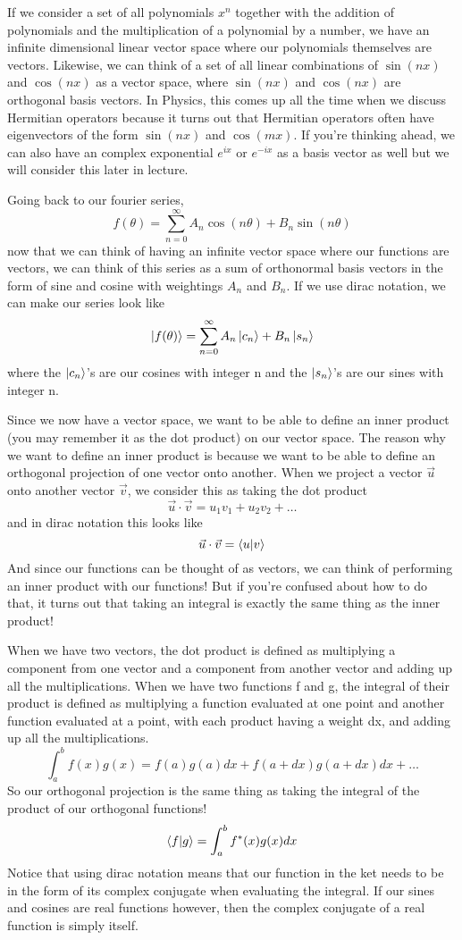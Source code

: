 \documentclass{article}
\newcommand{\be}{\begin{equation}}
\newcommand{\ee}{\end{equation}}
\begin{document}
If we consider a set of all polynomials $x^n$ together with the addition of polynomials and the multiplication of a polynomial by a number, we have an infinite dimensional linear vector space where our polynomials themselves are vectors.
Likewise, we can think of a set of all linear combinations of $\sin(nx)$ and $\cos(nx)$ as a vector space, where $\sin(nx)$ and $\cos(nx)$ are orthogonal basis vectors.
In Physics, this comes up all the time when we discuss Hermitian operators because it turns out that Hermitian operators often have eigenvectors of the form $\sin(nx)$ and $\cos(mx)$.
If you're thinking ahead, we can also have an complex exponential $e^{ix}$ or $e^{-ix}$ as a basis vector as well but we will consider this later in lecture.

Going back to our fourier series,
\be
  f(\theta) = \sum_{n = 0}^{\infty} A_n \cos(n \theta) + B_n \sin(n \theta)
\ee
now that we can think of having an infinite vector space where our functions are vectors, we can think of this series as a sum of orthonormal basis vectors in the form of sine and cosine with weightings $A_n$ and $B_n$.
If we use dirac notation, we can make our series look like
\be
  \ket{f(\theta)} = \sum_{n=0}^{\infty} A_n \ket{c_n} + B_n \ket{s_n}
\ee
where the $\ket{c_n}$'s are our cosines with integer n and the $\ket{s_n}$'s are our sines with integer n.

Since we now have a vector space, we want to be able to define an inner product (you may remember it as the dot product) on our vector space.
The reason why we want to define an inner product is because we want to be able to define an orthogonal projection of one vector onto another.
When we project a vector $\vec{u}$ onto another vector $\vec{v}$, we consider this as taking the dot product
\be
  \vec{u} \cdot \vec{v} = u_1v_1 + u_2v_2 + \hdots
\ee
and in dirac notation this looks like
\be
  \vec{u} \cdot \vec{v} = \braket{u|v}
\ee
And since our functions can be thought of as vectors, we can think of performing an inner product with our functions!
But if you're confused about how to do that, it turns out that taking an integral is exactly the same thing as the inner product!

When we have two vectors, the dot product is defined as multiplying a component from one vector and a component from another vector and adding up all the multiplications.
When we have two functions f and g, the integral of their product is defined as multiplying a function evaluated at one point and another function evaluated at a point, with each product having a weight dx, and adding up all the multiplications.
\be
  \int_a^b f(x)g(x) = f(a)g(a)dx + f(a + dx)g(a + dx)dx + \hdots
\ee
So our orthogonal projection is the same thing as taking the integral of the product of our orthogonal functions!
\be
  \braket{f|g} = \int_a^b f^*(x)g(x) dx
\ee
Notice that using dirac notation means that our function in the ket needs to be in the form of its complex conjugate when evaluating the integral.
If our sines and cosines are real functions however, then the complex conjugate of a real function is simply itself.
\end{document}
